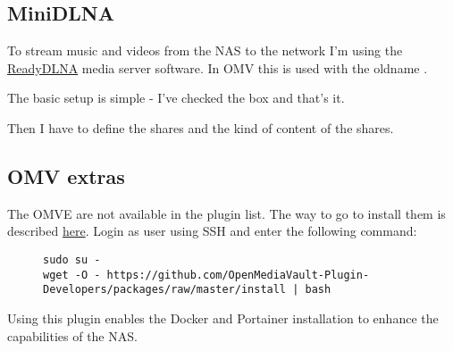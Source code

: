 
\subsection{MiniDLNA}

To stream music and videos from the \gls{NAS} to the network I'm using the
\href{https://sourceforge.net/projects/minidlna/}{ReadyDLNA} media server
software. In \gls{OMV} this is used with the oldname .


The basic setup is simple - I've checked the  box and that's
it.


Then I have to define the shares and the kind of content of the shares.


\subsection{OMV extras}

The \gls{OMVE} are not available in the plugin list. The way to go to install
them is described \href{https://forum.openmediavault.org/index.php?thread/39594-omvextras-for-omv6/}{here}.
Login as user  using SSH and enter the following command:

\begin{figure}[H]
    \centering
    \begin{tiny}
        \begin{BVerbatim}
sudo su -
wget -O - https://github.com/OpenMediaVault-Plugin-Developers/packages/raw/master/install | bash
        \end{BVerbatim}
    \end{tiny}
\end{figure}

Using this plugin enables the \gls{Docker} and \gls{Portainer} installation
to enhance the capabilities of the \gls{NAS}.


